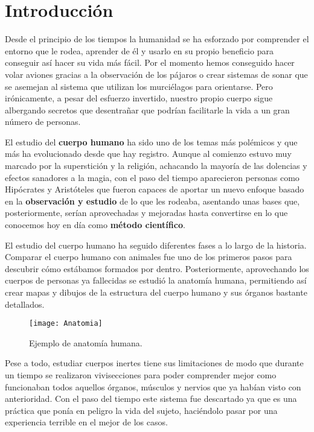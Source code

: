 \chapter{Introducción\label{sec:introduccion}}

Desde el principio de los tiempos la humanidad se ha esforzado por comprender el entorno que le rodea, aprender de él y usarlo en su propio beneficio para conseguir así hacer su vida más fácil. Por el momento hemos conseguido hacer volar aviones gracias a la observación de los pájaros o crear sistemas de sonar que se asemejan al sistema que utilizan los murciélagos para orientarse. Pero irónicamente, a pesar del esfuerzo invertido, nuestro propio cuerpo sigue albergando secretos que desentrañar que podrían facilitarle la vida a un gran número de personas.

El estudio del \textbf{cuerpo humano} ha sido uno de los temas más polémicos y que más ha evolucionado desde que hay registro. Aunque al comienzo estuvo muy marcado por la superstición y la religión, achacando la mayoría de las dolencias y efectos sanadores a la magia, con el paso del tiempo aparecieron personas como Hipócrates y Aristóteles que fueron capaces de aportar un nuevo enfoque basado en la \textbf{observación y estudio} de lo que les rodeaba, asentando unas bases que, posteriormente, serían aprovechadas y mejoradas hasta convertirse en lo que conocemos hoy en día como \textbf{método científico}.

El estudio del cuerpo humano ha seguido diferentes fases a lo largo de la historia. Comparar el cuerpo humano con animales fue uno de los primeros pasos para descubrir cómo estábamos formados por dentro. Posteriormente, aprovechando los cuerpos de personas ya fallecidas se estudió la anatomía humana, permitiendo así crear mapas y dibujos de la estructura del cuerpo humano y sus órganos bastante detallados.

\begin{figure} [H]
    \centering
    \texttt{[image: Anatomia]}
    \caption{Ejemplo de anatomía humana.}
    \label{fig:Anatomia}
\end{figure}

Pese a todo, estudiar cuerpos inertes tiene sus limitaciones de modo que durante un tiempo se realizaron vivisecciones para poder comprender mejor como funcionaban todos aquellos órganos, músculos y nervios que ya habían visto con anterioridad. Con el paso del tiempo este sistema fue descartado ya que es una práctica que ponía en peligro la vida del sujeto, haciéndolo pasar por una experiencia terrible en el mejor de los casos.

